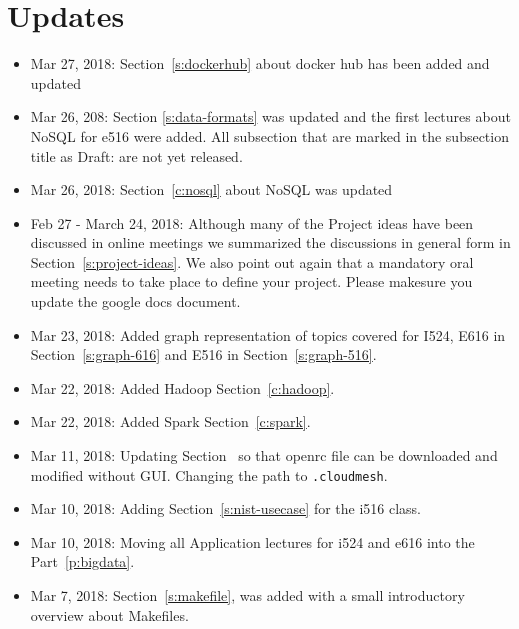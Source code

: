 
\chapter{Updates}


\begin{itemize}


\item Mar 27, 2018: Section~\ref{s:dockerhub} about docker hub has
  been added and updated

\item Mar 26, 208: Section \ref{s:data-formats} was updated and the
  first lectures about NoSQL for e516 were added. All subsection that
  are marked in the subsection title as Draft: are not yet released.

\item Mar 26, 2018: Section~\ref{c:nosql} about NoSQL was updated

\item Feb 27 - March 24, 2018: Although many of the Project ideas have been discussed
  in online meetings we summarized the discussions in general form in
  Section~\ref{s:project-ideas}. 
  We also point out again that a mandatory oral meeting needs to take
  place to define your project. Please makesure you update the google
  docs document.

\item Mar 23, 2018: Added graph representation of topics covered for
  I524, E616 in Section~\ref{s:graph-616} and E516 in Section~\ref{s:graph-516}.

\item Mar 22, 2018: Added Hadoop Section~\ref{c:hadoop}.

\item Mar 22, 2018: Added Spark Section~\ref{c:spark}.

\item Mar 11, 2018: Updating Section~\label{s:chameleon-openstack} so
  that openrc file can be downloaded and modified without
  GUI. Changing the path to \verb|.cloudmesh|.

\item Mar 10, 2018: Adding Section~\ref{s:nist-usecase} for the i516 class.

\item Mar 10, 2018: Moving all Application lectures for i524 and e616
  into the Part~\ref{p:bigdata}.

\item Mar 7, 2018: Section~\ref{s:makefile}, was added with a small
  introductory overview about Makefiles.


\end{itemize}
